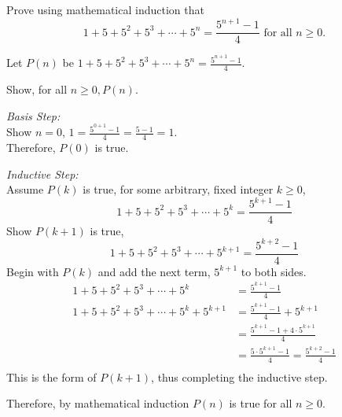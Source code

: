 \documentclass[12pt,addpoints]{exam}
\begin{document}
\begin{questions}
\question[12] Prove using mathematical induction that
\[ 1 + 5 + 5^2 + 5^3 + \cdots + 5^n = \frac{5^{n+1} - 1}{4} \text{ for all } n\geq 0. \]
    \ifprintanswers
        \vspace{-10pt}
   \fi
\begin{solution}
    Let $P(n)$ be $1 + 5 + 5^2 + 5^3 + \cdots + 5^n = \frac{5^{n+1} - 1}{4}$.

    \smallskip
    Show, for all $n\geq 0, P(n)$.

    \smallskip
    \textit{Basis Step:}\\ Show $n=0$, $1 = \frac{5^{0+1} - 1}{4} = \frac{5-1}{4} = 1.$ \\
    Therefore, $P(0)$ is true.

    \smallskip
    \textit{Inductive Step:} \\
    Assume $P(k)$ is true, for some arbitrary, fixed integer $k \geq 0$,
       \[ 1 + 5 + 5^2 + 5^3 + \cdots + 5^k = \frac{5^{k+1} - 1}{4} \]
    Show $P(k+1)$ is true,
      \[ 1 + 5 + 5^2 + 5^3 + \cdots + 5^{k+1} = \frac{5^{k+2} - 1}{4} \]
    Begin with $P(k)$ and add the next term, $5^{k+1}$ to both sides.
    \begin{align*}
        1 + 5 + 5^2 + 5^3 + \cdots + 5^k &= \frac{5^{k+1} - 1}{4} \\
        1 + 5 + 5^2 + 5^3 + \cdots + 5^k  + 5^{k+1} &= \frac{5^{k+1} - 1}{4} + 5^{k+1} \\
          &= \frac{5^{k+1} - 1 + 4\cdot 5^{k+1}}{4} \\
          &= \frac{5\cdot 5^{k+1} - 1}{4} = \frac{5^{k+2} - 1}{4} \\
    \end{align*}
    This is the form of $P(k+1)$, thus completing the inductive step.

    Therefore, by mathematical induction $P(n)$ is true for all $n \geq 0$.
\end{solution}



\end{questions}
\end{document}
